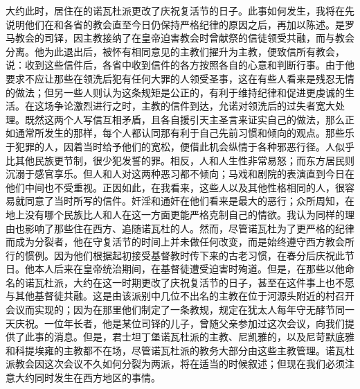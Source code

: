 大约此时，居住在的诺瓦杜派更改了庆祝复活节的日子。此事如何发生，我将在先说明他们在和各省的教会直至今日仍保持严格纪律的原因之后，再加以陈述。是罗马教会的司铎，因主教接纳了在皇帝迫害教会时曾献祭的信徒领受共融，而与教会分离。他为此退出后，被怀有相同意见的主教们擢升为主教，便致信所有教会，说：收到这些信件后，各省中收到信件的各方按照各自的心意和判断行事。由于他要求不应让那些在领洗后犯有任何大罪的人领受圣事，这在有些人看来是残忍无情的做法；但另一些人则认为这条规矩是公正的，有利于维持纪律和促进更虔诚的生活。在这场争论激烈进行之时，主教的信件到达，允诺对领洗后的过失者宽大处理。既然这两个人写信互相矛盾，且各自援引天主圣言来证实自己的做法，那么正如通常所发生的那样，每个人都认同那有利于自己先前习惯和倾向的观点。那些乐于犯罪的人，因着当时给予他们的宽松，便借此机会纵情于各种邪恶行径。人似乎比其他民族更节制，很少犯发誓的罪。相反，人和人生性非常易怒；而东方居民则沉溺于感官享乐。但人和人对这两种恶习都不倾向；马戏和剧院的表演直到今日在他们中间也不受重视。正因如此，在我看来，这些人以及其他性格相同的人，很容易就同意了当时所写的信件。奸淫和通奸在他们看来是最大的恶行；众所周知，在地上没有哪个民族比人和人在这一方面更能严格克制自己的情欲。我认为同样的理由也影响了那些住在西方、追随诺瓦杜的人。然而，尽管诺瓦杜为了更严格的纪律而成为分裂者，他在守复活节的时间上并未做任何改变，而是始终遵守西方教会所行的惯例。因为他们根据起初接受基督教时传下来的古老习惯，在春分后庆祝此节日。他本人后来在皇帝统治期间，在基督徒遭受迫害时殉道。但是，在那些以他命名的诺瓦杜派，大约在这一时期更改了庆祝复活节的日子，甚至在这件事上也不愿与其他基督徒共融。这是由该派别中几位不出名的主教在位于河源头附近的村召开会议而实现的；因为在那里他们制定了一条教规，规定在犹太人每年守无酵节同一天庆祝。一位年长者，他是某位司铎的儿子，曾随父亲参加过这次会议，向我们提供了此事的消息。但是，君士坦丁堡诺瓦杜派的主教、尼凯雅的，以及尼苛默底雅和科提埃雍的主教都不在场，尽管诺瓦杜派的教务大部分由这些主教管理。诺瓦杜派教会因这次会议不久如何分裂为两派，将在适当的时候叙述；但现在我们必须注意大约同时发生在西方地区的事情。\par


